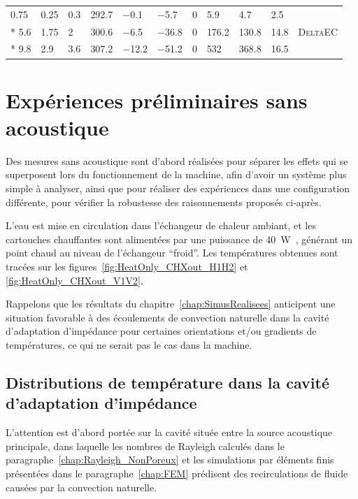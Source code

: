 \begin{longtable}{llll llll lll}
	 \hdashline
	\num{.75} & \num{.25} & \num{.3} & \num{292.7} & \num{-.1} & \num{-5.7} & \num{0} & \num{5.9} & \num{4.7} & \num{2.5} & \multirow{3}{*}{\textsc{DeltaEC}} \\*
	\num{5.6} & \num{1.75} & \num{2} & \num{300.6} & \num{-6.5} & \num{-36.8} & \num{0} & \num{176.2} & \num{130.8} & \num{14.8} & \\*
	\num{9.8} & \num{2.9} & \num{3.6} & \num{307.2} & \num{-12.2} & \num{-51.2} & \num{0} & \num{532} & \num{368.8} & \num{16.5} & \\

\end{longtable}
\section{Expériences préliminaires sans acoustique}\label{chap:DistribTemperature_HeatOnly}
Des mesures sans acoustique sont d'abord réalisées pour séparer les effets qui se superposent lors du fonctionnement de la machine, afin d'avoir un système plus simple à analyser, ainsi que pour réaliser des expériences dans une configuration différente, pour vérifier la robustesse des raisonnements proposés ci-après.

L'eau est mise en circulation dans l'échangeur de chaleur ambiant, et les cartouches chauffantes sont alimentées par une puissance de \qty{40}{\watt\rms}, générant un point chaud au niveau de l'échangeur ``froid''. Les températures obtenues sont tracées sur les figures~\ref{fig:HeatOnly_CHXout_H1H2} et \ref{fig:HeatOnly_CHXout_V1V2}. 

Rappelons que les résultats du chapitre~\ref{chap:SimusRealisees} anticipent une situation favorable à des écoulements de convection naturelle dans la cavité d'adaptation d'impédance pour certaines orientations et/ou gradients de températures, ce qui ne serait pas le cas dans la machine.

\subsection{Distributions de température dans la cavité d'adaptation d'impédance}
L'attention est d'abord portée sur la cavité située entre la source acoustique principale, dans laquelle les nombres de Rayleigh calculés dans le paragraphe~\ref{chap:Rayleigh_NonPoreux} et les simulations par éléments finis présentées dans le paragraphe~\ref{chap:FEM} prédisent des recirculations de fluide causées par la convection naturelle.

